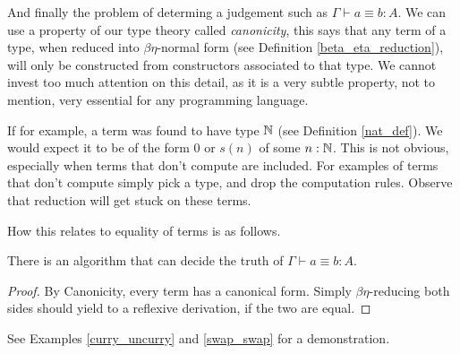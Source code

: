 And finally the problem of determing a judgement such as $\Gamma \vdash a \equiv b : A$. We can use a property of our type theory called \emph{canonicity}, this says that any term of a type, when reduced into $\beta \eta$-normal form (see Definition \ref{beta_eta_reduction}), will only be constructed from constructors associated to that type. We cannot invest too much attention on this detail, as it is a very subtle property, not to mention, very essential for any programming language.

If for example, a term was found to have type $\mathbb{N}$ (see Definition \ref{nat_def}). We would expect it to be of the form $0$ or $s(n)$ of some $n : \mathbb{N}$. This is not obvious, especially when terms that don't compute are included. For examples of terms that don't compute simply pick a type, and drop the computation rules. Observe that reduction will get stuck on these terms.

How this relates to equality of terms is as follows.

\begin{theorem}
    There is an algorithm that can decide the truth of $\Gamma \vdash a \equiv b : A$.
\end{theorem}

\begin{proof}
    By Canonicity, every term has a canonical form. Simply $\beta \eta$-reducing both sides should yield to a reflexive derivation, if the two are equal.
\end{proof}

\begin{remark}
    See Examples \ref{curry_uncurry} and \ref{swap_swap} for a demonstration.
\end{remark}







